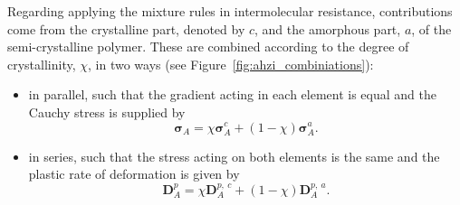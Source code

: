 Regarding applying the mixture rules in intermolecular resistance, contributions come from the crystalline part, denoted by $c$, and the amorphous part, $a$, of the semi-crystalline polymer.
These are combined according to the degree of crystallinity, $\chi$, in two ways (see Figure~\ref{fig:ahzi_combiniations}):
\begin{itemize}
	\item in parallel, such that the gradient acting in each element is equal and the Cauchy stress is supplied by
	\begin{equation}
		\bm\sigma_A = \chi\bm\sigma_A^c + (1 -\chi)\bm\sigma_A^a.
	\end{equation}
	\item in series, such that the stress acting on both elements is the same and the plastic rate of deformation is given by
	\begin{equation}
		\bm D^p_A = \chi \bm D^{p,\ c}_A + (1 -\chi)\bm D^{p,\ a}_A.
	\end{equation}
\end{itemize}
